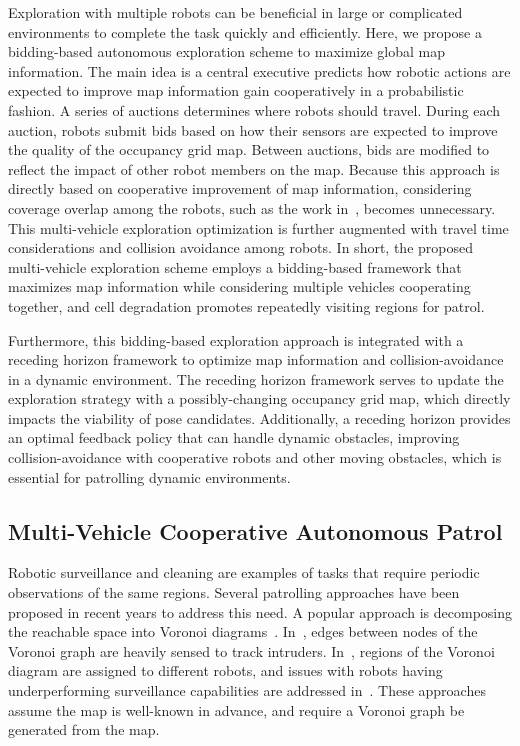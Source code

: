 \documentclass[smallextended]{svjour3}       %
\begin{document}
Exploration with multiple robots can be beneficial in large or complicated environments to complete the task quickly and efficiently. Here, we propose a bidding-based autonomous exploration scheme to maximize global map information. The main idea is a central executive predicts how robotic actions are expected to improve map information gain cooperatively in a probabilistic fashion. A series of auctions determines where robots should travel. During each auction, robots submit bids based on how their sensors are expected to improve the quality of the occupancy grid map. Between auctions, bids are modified to reflect the impact of other robot members on the map. Because this approach is directly based on cooperative improvement of map information, considering coverage overlap among the robots, such as the work in~\cite{SimApfBurFoxMooThrYou00}, becomes unnecessary. This multi-vehicle exploration optimization is further augmented with travel time considerations and collision avoidance among robots. In short, the proposed multi-vehicle exploration scheme employs a bidding-based framework that maximizes map information while considering multiple vehicles cooperating together, and cell degradation promotes repeatedly visiting regions for patrol.

Furthermore, this bidding-based exploration approach is integrated with a receding horizon framework to optimize map information and collision-avoidance in a dynamic environment. The receding horizon framework serves to update the exploration strategy with a possibly-changing occupancy grid map, which directly impacts the viability of pose candidates. Additionally, a receding horizon provides an optimal feedback policy that can handle dynamic obstacles, improving collision-avoidance with cooperative robots and other moving obstacles, which is essential for patrolling dynamic environments.


\subsection{Multi-Vehicle Cooperative Autonomous Patrol}

Robotic surveillance and cleaning are examples of tasks that require periodic observations of the same regions. Several patrolling approaches have been proposed in recent years to address this need. A popular approach is decomposing the reachable space into Voronoi diagrams~\cite{KolCar08,PorRoc10,PipChrWei13}. In~\cite{KolCar08}, edges between nodes of the Voronoi graph are heavily sensed to track intruders. In~\cite{PorRoc10}, regions of the Voronoi diagram are assigned to different robots, and issues with robots having underperforming surveillance capabilities are addressed in~\cite{PipChrWei13}. These approaches assume the map is well-known in advance, and require a Voronoi graph be generated from the map.
\end{document}
